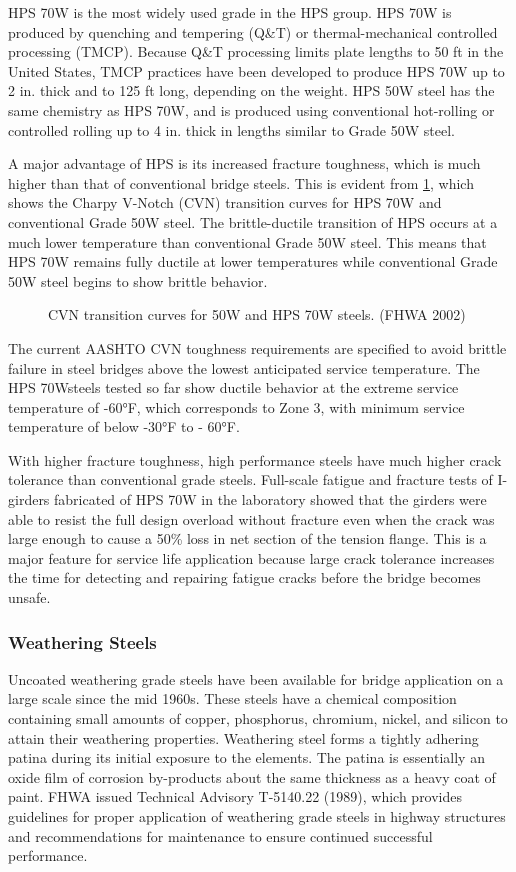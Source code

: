 HPS 70W is the most widely used grade in the HPS group. HPS 70W is produced by quenching and tempering (Q\&T) or thermal-mechanical controlled processing (TMCP). Because Q\&T processing limits plate lengths to 50 ft in the United States, TMCP practices have been developed to produce HPS 70W up to 2 in. thick and to 125 ft long, depending on the weight. HPS 50W steel has the same chemistry as HPS 70W, and is produced using conventional hot-rolling or controlled rolling up to 4 in. thick in lengths similar to Grade 50W steel.

A major advantage of HPS is its increased fracture toughness, which is much higher than that of conventional bridge steels. This is evident from \cref{fig:transition-curves-steel}, which shows the Charpy V-Notch (CVN) transition curves for HPS 70W and conventional Grade 50W steel. The brittle-ductile transition of HPS occurs at a much lower temperature than conventional Grade 50W steel. This means that HPS 70W remains fully ductile at lower temperatures while conventional Grade 50W steel begins to show brittle behavior.

\begin{figure}
  \caption{CVN transition curves for 50W and HPS 70W steels. (FHWA 2002)}\label{fig:transition-curves-steel}
\end{figure}

The current AASHTO CVN toughness requirements are specified to avoid brittle failure in steel bridges above the lowest anticipated service temperature. The HPS 70Wsteels tested so far show ductile behavior at the extreme service temperature of -60°F, which corresponds to Zone 3, with minimum service temperature of below -30°F to - 60°F.

With higher fracture toughness, high performance steels have much higher crack tolerance than conventional grade steels. Full-scale fatigue and fracture tests of I-girders fabricated of HPS 70W in the laboratory showed that the girders were able to resist the full design overload without fracture even when the crack was large enough to cause a 50\% loss in net section of the tension flange. This is a major feature for service life application because large crack tolerance increases the time for detecting and repairing fatigue cracks before the bridge becomes unsafe.

\subsubsection{Weathering Steels}
Uncoated weathering grade steels have been available for bridge application on a large scale since the mid 1960s.  These steels have a chemical composition containing small amounts of copper, phosphorus, chromium, nickel, and silicon to attain their weathering properties. Weathering steel forms a tightly adhering patina during its initial exposure to the elements. The patina is essentially an oxide film of corrosion by-products about the same thickness as a heavy coat of paint. FHWA issued Technical Advisory T-5140.22 (1989), which provides guidelines for proper application of weathering grade steels in highway structures and recommendations for maintenance to ensure continued successful performance.

